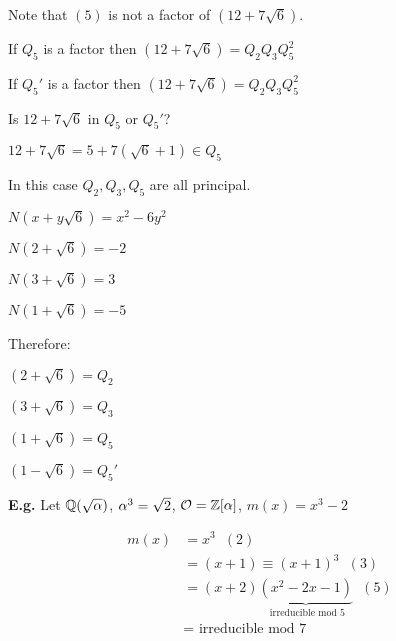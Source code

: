 \documentclass[11pt]{article}
\begin{document}
Note that $(5)$ is not a factor of $(12 + 7 \sqrt6)$.

\spa


If $Q_5$ is a factor then $(12 + 7\sqrt6) = Q_2Q_3Q_5^2$

If $Q_5'$ is a factor then $(12 + 7\sqrt6) = Q_2Q_3Q_5^2$
\spa

Is $12 + 7\sqrt6 $ in $Q_5$ or $Q_5'$?
\spa

$12+7\sqrt6 = 5 + 7(\sqrt6 + 1) \in Q_5$
 \spa

 In this case $Q_2, Q_3, Q_5$ are all principal.
 \spa

 $N(x+y\sqrt6) = x^2 - 6y^2$
 \spa


 $N(2+ \sqrt6)  = - 2$

 
 $N(3+ \sqrt6)  = 3$
 
 
 $N(1+ \sqrt6)  = - 5$
\spa

 Therefore:

 
 $(2 + \sqrt6 ) = Q_2$
 
 $(3 + \sqrt6 ) = Q_3$ 

 $(1+ \sqrt6 ) = Q_5$
 
 $(1 - \sqrt6 ) = Q_5'$

\spac 
\textbf{E.g.} Let $ \mathbb{Q}(\sqrt{\alpha})$,  $\alpha^3 =\sqrt2$, $\mathcal{O} =  \mathbb{Z}[\alpha]$, $m(x) = x^3 - 2$



\begin{align*}
	m(x) & = x^3 \hspace{7pt} (2)\\
	& = (x+1) \equiv (x+1)^3 \hspace{7pt} (3)\\
	& = (x+2) \underbrace{(x^2-2x-1)}_\text{ irreducible mod 5} \hspace{7pt} (5)\\
	& = \text{ irreducible mod 7}
\end{align*}
 
 
 
 
 
 
 
 
 
 
 
 
 
 
 
 
 
 
 
 
 
 
\end{document}
